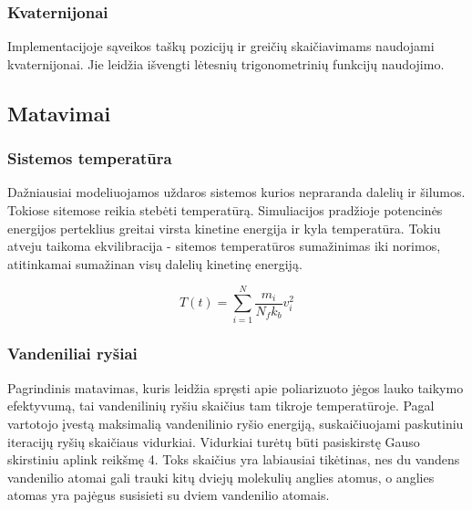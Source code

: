 \subsubsection{Kvaternijonai}
\label{sec:quaternions}

Implementacijoje sąveikos taškų pozicijų ir greičių skaičiavimams naudojami kvaternijonai.
Jie leidžia išvengti lėtesnių trigonometrinių funkcijų naudojimo.



\subsection{Matavimai}


\subsubsection{Sistemos temperatūra}
\label{sec:model_equilibration}

Dažniausiai modeliuojamos uždaros sistemos kurios nepraranda dalelių ir šilumos.
Tokiose sitemose reikia stebėti temperatūrą.
Simuliacijos pradžioje potencinės energijos perteklius greitai virsta kinetine energija ir kyla temperatūra.
Tokiu atveju taikoma ekvilibracija - sitemos temperatūros sumažinimas iki norimos, atitinkamai sumažinan visų dalelių kinetinę energiją.

\begin{equation}
    T(t) = \sum\limits_{i=1}^N {\dfrac {m_i} {N_{f}k_{b}} v_i^2}
\end{equation}


\subsubsection{Vandeniliai ryšiai}
\label{sec:hydrogen_bonds}

Pagrindinis matavimas, kuris leidžia spręsti apie poliarizuoto jėgos lauko taikymo efektyvumą,
tai vandenilinių ryšiu skaičius tam tikroje temperatūroje.
Pagal vartotojo įvestą maksimalią vandenilinio ryšio energiją, suskaičiuojami paskutiniu iteracijų ryšių skaičiaus vidurkiai.
Vidurkiai turėtų būti pasiskirstę Gauso skirstiniu aplink reikšmę 4.
Toks skaičius yra labiausiai tikėtinas, nes du vandens vandenilio atomai gali trauki kitų dviejų molekulių anglies atomus,
o anglies atomas yra pajėgus susisieti su dviem vandenilio atomais.


